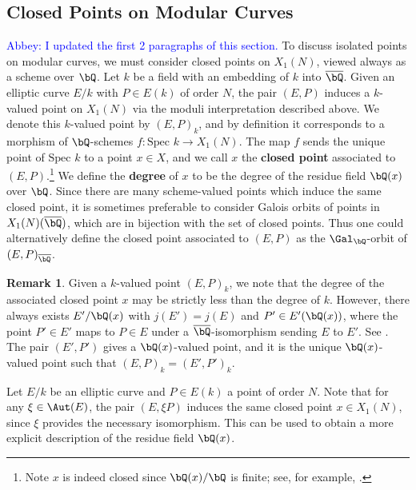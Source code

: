 \documentclass[11pt,reqno]{amsart}
\theoremstyle{plain}
\theoremstyle{definition}
\newtheorem{remark}[theorem]{Remark}
\newcommand{\Q}{\bQ}
\newcommand{\abbey}[1]{\textcolor{blue}{Abbey: #1}}
\begin{document}
\subsection{Closed Points on Modular Curves}\abbey{I updated the first 2 paragraphs of this section.} To discuss isolated points on modular curves, we must consider closed points on $X_1(N)$, viewed always as a scheme over $\Q$. Let $k$ be a field with an embedding of $k$ into $\overline \Q$. Given an elliptic curve $E/k$ with $P \in E(k)$ of order $N$, the pair $(E,P)$ induces a $k$-valued point on $X_1(N)$ via the moduli interpretation described above. We denote this $k$-valued point by $(E,P)_k$, and by definition it corresponds to a morphism of $\Q$-schemes $f:\text{Spec } k \rightarrow X_1(N)$. The map $f$ sends the unique point of $\text{Spec } k$ to a point $x \in X$, and we call $x$ the \textbf{closed point} associated to $(E,P)$.\footnote{Note $x$ is indeed closed since $\Q(x)/\Q$ is finite; see, for example, \cite[Exercise 5.9, p.76] {Liu2002}.} We define the \textbf{degree} of $x$ to be the degree of the residue field $\Q(x)$ over $\Q$. Since there are many scheme-valued points which induce the same closed point, it is sometimes preferable to consider Galois orbits of points in $X_1(N)(\overline{\Q})$, which are in bijection with the set of closed points. Thus one could alternatively define the closed point associated to $(E,P)$ as the $\Gal_\Q$-orbit of $(E,P)_{\overline{\Q}}$.

\begin{remark} Given a $k$-valued point $(E,P)_k$, we note that the degree of the associated closed point $x$ may be strictly less than the degree of $k$. However, there always exists $E'/\Q(x)$ with $j(E')=j(E)$ and $P' \in E'(\Q(x))$, where the point $P' \in E'$ maps to $P \in E$ under a $\overline \Q$-isomorphism sending $E$ to $E'$. See \cite[p. 274, Proposition VI.3.2]{DR}. The pair $(E',P')$ gives a $\Q(x)$-valued point, and it is the unique $\Q(x)$-valued point such that $(E,P)_{k}=(E',P')_{k}.$
\end{remark}

Let $E/k$ be an elliptic curve and $P \in E(k)$ a point of order $N$. Note that for any $\xi \in \Aut(E)$, the pair $(E,\xi P)$ induces the same closed point $x \in X_1(N)$, since $\xi$ provides the necessary isomorphism. This can be used to obtain a more explicit description of the residue field $\Q(x)$.
\end{document}
